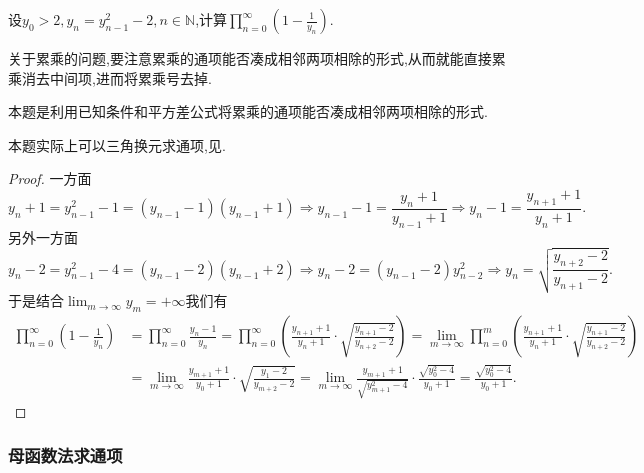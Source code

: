 \documentclass[../../main.tex]{subfiles}%
\begin{document}
\begin{example}
设\(y_0>2,y_n=y_{n - 1}^{2}-2,n\in\mathbb{N}\),计算\(\prod_{n = 0}^{\infty}(1 - \frac{1}{y_n})\).  
\end{example}
\begin{note}
关于累乘的问题,要注意累乘的通项能否凑成相邻两项相除的形式,从而就能直接累乘消去中间项,进而将累乘号去掉.

本题是利用已知条件和平方差公式将累乘的通项能否凑成相邻两项相除的形式.
\end{note}
\begin{remark}
本题实际上可以三角换元求通项,见.
\end{remark}
\begin{proof}

一方面
\[
y_n + 1=y_{n - 1}^{2}-1=(y_{n - 1}-1)(y_{n - 1}+1)\Rightarrow y_{n - 1}-1=\frac{y_n + 1}{y_{n - 1}+1}\Rightarrow y_n - 1=\frac{y_{n + 1}+1}{y_n + 1}.
\]
另外一方面
\[
y_n - 2=y_{n - 1}^{2}-4=(y_{n - 1}-2)(y_{n - 1}+2)\Rightarrow y_n - 2=(y_{n - 1}-2)y_{n - 2}^{2}\Rightarrow y_n=\sqrt{\frac{y_{n + 2}-2}{y_{n + 1}-2}}.
\]
于是结合\(\lim_{m\rightarrow\infty}y_m = +\infty\)我们有
\begin{align*}
\prod_{n = 0}^{\infty}\left(1-\frac{1}{y_n}\right)&=\prod_{n=0}^{\infty}{\frac{y_n-1}{y_n}}=\prod_{n = 0}^{\infty}\left(\frac{y_{n + 1}+1}{y_n + 1}\cdot\sqrt{\frac{y_{n + 1}-2}{y_{n + 2}-2}}\right)
=\lim_{m\rightarrow\infty}\prod_{n = 0}^{m}\left(\frac{y_{n + 1}+1}{y_n + 1}\cdot\sqrt{\frac{y_{n + 1}-2}{y_{n + 2}-2}}\right)\\
&=\lim_{m\rightarrow\infty}\frac{y_{m + 1}+1}{y_0 + 1}\cdot\sqrt{\frac{y_1 - 2}{y_{m + 2}-2}}
=\lim_{m\rightarrow\infty}\frac{y_{m + 1}+1}{\sqrt{y_{m + 1}^{2}-4}}\cdot\frac{\sqrt{y_0^{2}-4}}{y_0 + 1}
=\frac{\sqrt{y_0^{2}-4}}{y_0 + 1}.
\end{align*}

\end{proof}





\subsubsection{母函数法求通项}
\end{document}
